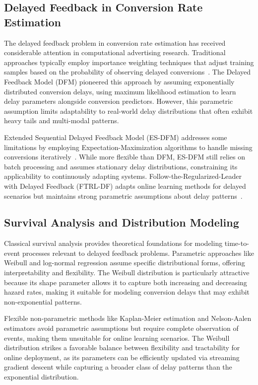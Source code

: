 \documentclass{article}
\begin{document}
\subsection{Delayed Feedback in Conversion Rate Estimation}

The delayed feedback problem in conversion rate estimation has received considerable attention in computational advertising research. Traditional approaches typically employ importance weighting techniques that adjust training samples based on the probability of observing delayed conversions~\cite{yang2020capturing}. The Delayed Feedback Model (DFM) pioneered this approach by assuming exponentially distributed conversion delays, using maximum likelihood estimation to learn delay parameters alongside conversion predictors. However, this parametric assumption limits adaptability to real-world delay distributions that often exhibit heavy tails and multi-modal patterns.

Extended Sequential Delayed Feedback Model (ES-DFM) addresses some limitations by employing Expectation-Maximization algorithms to handle missing conversions iteratively~\cite{gu2021real}. While more flexible than DFM, ES-DFM still relies on batch processing and assumes stationary delay distributions, constraining its applicability to continuously adapting systems. Follow-the-Regularized-Leader with Delayed Feedback (FTRL-DF) adapts online learning methods for delayed scenarios but maintains strong parametric assumptions about delay patterns~\cite{yasui2020feedback}.

\subsection{Survival Analysis and Distribution Modeling}

Classical survival analysis provides theoretical foundations for modeling time-to-event processes relevant to delayed feedback problems. Parametric approaches like Weibull and log-normal regression assume specific distributional forms, offering interpretability and flexibility. The Weibull distribution is particularly attractive because its shape parameter allows it to capture both increasing and decreasing hazard rates, making it suitable for modeling conversion delays that may exhibit non-exponential patterns.

Flexible non-parametric methods like Kaplan-Meier estimation and Nelson-Aalen estimators avoid parametric assumptions but require complete observation of events, making them unsuitable for online learning scenarios. The Weibull distribution strikes a favorable balance between flexibility and tractability for online deployment, as its parameters can be efficiently updated via streaming gradient descent while capturing a broader class of delay patterns than the exponential distribution.
\end{document}
